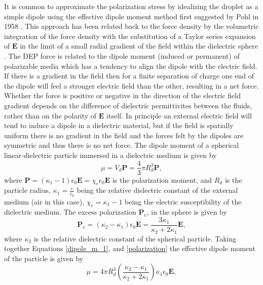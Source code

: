 \documentclass[a4paper, 12pt]{article}
\begin{document}
It is common to approximate the polarization stress by idealizing the droplet as a simple dipole using the effective dipole moment method first suggested by Pohl in 1958 \cite{pohl_effects_1958}. This approach has been related back to the force density by the volumetric integration of the force density with the substitution of a Taylor series expansion of $\mathbf{E}$ in the limit of a small radial gradient of the field within the dielectric sphere \cite{wang_general_1997}. The DEP force is related to the dipole moment (induced or permanent) of polarizable media which has a tendency to align the dipole with the electric field. If there is a gradient in the field then for a finite separation of charge one end of the dipole will feel a stronger electric field than the other, resulting in a net force. Whether the force is positive or negative in the direction of the electric field gradient depends on the difference of dielectric permittivites between the fluids, rather than on the polarity of $\mathbf{E}$ itself. In principle an external electric field will tend to induce a dipole in a dielectric material, but if the field is spatially uniform there is no gradient in the field and the forces felt by the dipoles are symmetric and thus there is no net force. The dipole moment of a spherical linear-dielectric particle immersed in a dielectric medium is given by
\begin{equation} \label{dipole_m_1}
\mu = V_d \mathbf{P} = \frac{4}{3} \pi R_d^3 \mathbf{P},
\end{equation} 
where $\mathbf{P} = \left(\kappa_1 - 1 \right) \epsilon_0 \mathbf{E} = \chi_e \epsilon_0 \mathbf{E}$ is the polarization moment, and $R_d$ is the particle radius, $\kappa_1 = \frac{\epsilon}{\epsilon_0}$ being the relative dielectric constant of the external medium (air in this case), $\chi_e = \kappa_1 - 1$ being the electric susceptibility of the dielectric medium. The excess polarization $\mathbf{P}_e$, in the sphere is given by
\begin{equation} \label{polarization}
\mathbf{P}_e = \left( \kappa_2 - \kappa_1 \right) \epsilon_0 \mathbf{E} = \frac{3 \kappa_1}{\kappa_2 +2\kappa_1}\mathbf{E},
\end{equation}
where $\kappa_2$ is the relative dielectric constant of the spherical particle. Taking together Equations \ref{dipole_m_1}, and \ref{polarization} the effective dipole moment of the particle is given by 
\begin{equation}\label{dipole_m_2}
\mu = 4 \pi R_d^3 \left( \frac{\kappa_2 - \kappa_1}{\kappa_2 + 2 \kappa_1} \right) \kappa_1 \epsilon_0 \mathbf{E},
\end{equation}
\end{document}
